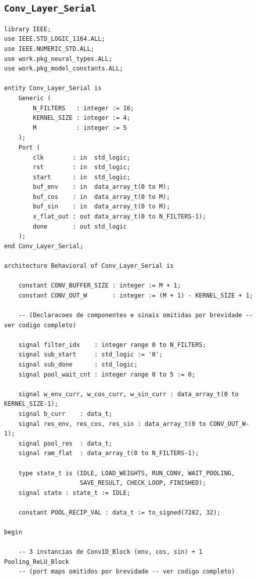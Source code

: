 \documentclass[a4paper,12pt]{article}
\begin{document}
\subsection{\texttt{Conv\_Layer\_Serial}}

\begin{lstlisting}[style=vhdlstyle,
    caption={C\'odigo VHDL do \texttt{Conv\_Layer\_Serial}.},
    label={lst:conv_serial}]
library IEEE;
use IEEE.STD_LOGIC_1164.ALL;
use IEEE.NUMERIC_STD.ALL;
use work.pkg_neural_types.ALL;
use work.pkg_model_constants.ALL;

entity Conv_Layer_Serial is
    Generic (
        N_FILTERS   : integer := 16;
        KERNEL_SIZE : integer := 4;
        M           : integer := 5
    );
    Port (
        clk        : in  std_logic;
        rst        : in  std_logic;
        start      : in  std_logic;
        buf_env    : in  data_array_t(0 to M);
        buf_cos    : in  data_array_t(0 to M);
        buf_sin    : in  data_array_t(0 to M);
        x_flat_out : out data_array_t(0 to N_FILTERS-1);
        done       : out std_logic
    );
end Conv_Layer_Serial;

architecture Behavioral of Conv_Layer_Serial is

    constant CONV_BUFFER_SIZE : integer := M + 1;
    constant CONV_OUT_W       : integer := (M + 1) - KERNEL_SIZE + 1;

    -- (Declaracoes de componentes e sinais omitidas por brevidade -- ver codigo completo)

    signal filter_idx    : integer range 0 to N_FILTERS;
    signal sub_start     : std_logic := '0';
    signal sub_done      : std_logic;
    signal pool_wait_cnt : integer range 0 to 5 := 0;

    signal w_env_curr, w_cos_curr, w_sin_curr : data_array_t(0 to KERNEL_SIZE-1);
    signal b_curr    : data_t;
    signal res_env, res_cos, res_sin : data_array_t(0 to CONV_OUT_W-1);
    signal pool_res  : data_t;
    signal ram_flat  : data_array_t(0 to N_FILTERS-1);

    type state_t is (IDLE, LOAD_WEIGHTS, RUN_CONV, WAIT_POOLING,
                     SAVE_RESULT, CHECK_LOOP, FINISHED);
    signal state : state_t := IDLE;

    constant POOL_RECIP_VAL : data_t := to_signed(7282, 32);

begin

    -- 3 instancias de Conv1D_Block (env, cos, sin) + 1 Pooling_ReLU_Block
    -- (port maps omitidos por brevidade -- ver codigo completo)


\end{lstlisting}
\end{document}
